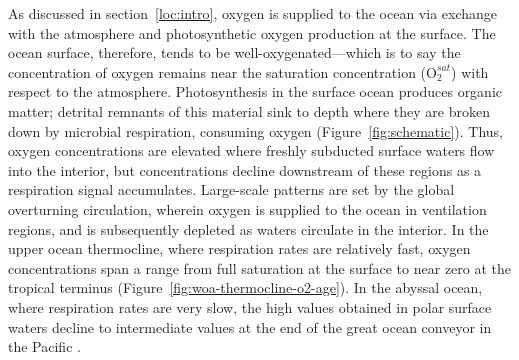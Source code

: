 \documentclass{report_chapter}
\begin{document}
As discussed in section~\ref{loc:intro}, oxygen is supplied to the ocean via exchange with the atmosphere and photosynthetic oxygen production at the surface.
The ocean surface, therefore, tends to be well-oxygenated---which is to say the concentration of oxygen remains near the saturation concentration ($\mathrm{O}_2^{sat}$) with respect to the atmosphere.
Photosynthesis in the surface ocean produces organic matter; detrital remnants of this material sink to depth where they are broken down by microbial respiration, consuming oxygen (Figure~\ref{fig:schematic}).
Thus, oxygen concentrations are elevated where freshly subducted surface waters flow into the interior, but concentrations decline downstream of these regions as a respiration signal accumulates.
Large-scale patterns are set by the global overturning circulation, wherein oxygen is supplied to the ocean in ventilation regions, and is subsequently depleted as waters circulate in the interior.
In the upper ocean thermocline, where respiration rates are relatively fast, oxygen concentrations span a range from full saturation at the surface to near zero at the tropical terminus (Figure~\ref{fig:woa-thermocline-o2-age}).
In the abyssal ocean, where respiration rates are very slow, the high \OO{} values obtained in polar surface waters decline to intermediate values at the end of the great ocean conveyor in the Pacific \citep{Broecker-1991}.
\end{document}

